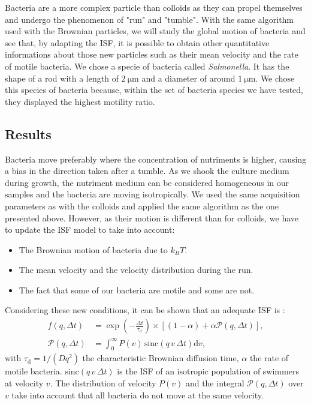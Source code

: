 \documentclass[%
 aip,
 jmp,%
 amsmath,amssymb,
reprint,%
]{revtex4-1}
\begin{document}
Bacteria are a more complex particle than colloids as they can propel themselves and undergo the phenomenon of "run" and "tumble". With the same algorithm used with the Brownian particles, we will study the global motion of bacteria and see that, by adapting the ISF, it is possible to obtain other quantitative informations about those new particles \citep{4_Martinez20121637} such as their mean velocity and the rate of motile bacteria. We chose a specie of bacteria called \textit{Salmonella}. It has the shape of a rod with a length of $\SI{2}{\micro\meter}$ and a diameter of around $\SI{1}{\micro\meter}$. We chose this species of bacteria because, within the set of bacteria species we have tested, they displayed the highest motility ratio.

\subsection{Results}

Bacteria move preferably where the concentration of nutriments is higher, causing a bias in the direction taken after a tumble. As we shook the culture medium during growth, the nutriment medium can be considered homogeneous in our samples and the bacteria are moving isotropically. We used the same acquisition parameters as with the colloids and applied the same algorithm as the one presented above. However, as their motion is different than for colloids, we have to update the ISF model to take into account:

\begin{itemize}
\item The Brownian motion of bacteria due to $k_BT$.
\item The mean velocity and the velocity distribution during the run.
\item The fact that some of our bacteria are motile and some are not.
\end{itemize}

Considering these new conditions, it can be shown that an adequate ISF is \citep{1_BactMobil}:
\begin{align}
f(q, \Delta t) &= \exp\left(-\frac{\Delta t}{\tau_\text{d}}\right)
\times\left[(1-\alpha) + \alpha \mathcal{P}(q, \Delta t)\right],\\
\mathcal{P}(q, \Delta t) &= \int_{0}^{\infty} P(v)\, \text{sinc}(q\, v\, \Delta t) \mathrm{d}v,
\end{align}
with $\tau_\text{d} = 1/(Dq^2)$ the characteristic Brownian diffusion time, $\alpha$ the rate of motile bacteria. $\text{sinc}(q\, v\, \Delta t)$ is the ISF of an isotropic population of swimmers at velocity $v$. The distribution of velocity $P(v)$ and the integral $\mathcal{P}(q, \Delta t)$ over $v$ take into account that all bacteria do not move at the same velocity. 
\end{document}
